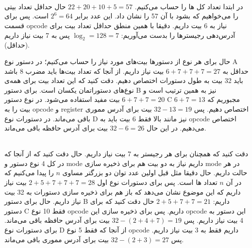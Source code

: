 \\
\linebreak
{}\\
\\
در ابتدا تعداد کل
ها
را حساب می‌کنیم.
$22 + 20 + 10 + 5 = 57$
حال حداقل تعداد بیتی را می‌خواهیم که بشود با آن 57 را نشان داد.
این عدد برابر
$2^6=64$
است.
پس برای قسمت
opcode
نیاز به 6 بیت داریم.
دقیقا با همین منطق حداقل تعداد بیت برای آدرس‌دهی رجیستر‌ها را بدست می‌آوریم:
$\log_2 = 128 = 7$
پس به 7 بیت نیاز داریم (حداقل).

\noindent
حال برای هر نوع از دستور‌ها بیت‌های مورد نیاز را حساب می‌کنیم؛
در دستور نوع
A
حداقل به
$6 + 7 + 7 + 7 = 27$
بیت نیاز داریم. از آنجا که تعداد بیت‌ها باید مضرب 8 باشد باید 32 بیت به طول دستورات اختصاص دهیم.
دقت کنید که این تعداد بیت برای همه‌ی نوع‌های دستوراتمان یکسان است.
برای دستور
B
نیز به همین ترتیب است و 
$6 + 7 + 7 = 20$
بیت مفید استفاده می‌شود.
در نوع دستور
C
مجبوریم که
$6 + 7 = 13$
بیت را به
opcode و register
اختصاص دهیم. پس 
$32 - 13 = 19$
بیت برای آدرس مموری باقی می‌ماند.
در دستورات نوع
D
نیز مانند بالا فقط 6 بیت باید به
opcode
اختصاص می‌دهیم. در این حال
$32 - 6 = 26$
بیت برای آدرس حافظه باقی می‌ماند.

\\
دقت کنید که همچنان برای هر رجیستر به 7 بیت نیاز داریم.
حال دقت کنید که از آنجا که در کل 4 نوع دستور و
mode
داریم نیاز به دو بیت هم برای ذخیره سازی
mode
در هر حالت داریم.
حال دقیقا مثل قبل اولین عدد توان دو بزرگتر مساوی
$n$
را پیدا می‌کنیم که در آن
$n$
تعداد
ها
است.
پس برای دستورات نوع اول
$2 + 5 + 7 + 7 + 7 = 28$
بیت نیاز داریم که این موضوع نشان می‌دهد که باز هم برای ذخیره سازی دستورات به 32 بیت نیاز داریم.
حال برای دستور
B
داریم:
$2 + 5 + 7 + 7 = 21$
حال دقت کنید که برای دستور
C
فقط 10 نوع
opcode
داریم. پس برای ذخیره سازی این
opcode
این دستور به 4 بیت نیاز داریم.
پس
$32 - (2 + 4 + 7) = 19$
بیت برای آدرس حافظه باقی می‌ماند.
برای دستورات نوع
D
از آنجا که فقط 5 نوع
opcode
داریم فقط به 3 بیت نیاز داریم.
پس
$32 - (2 + 3) = 27$
بیت برای آدرس مموری باقی می‌ماند.